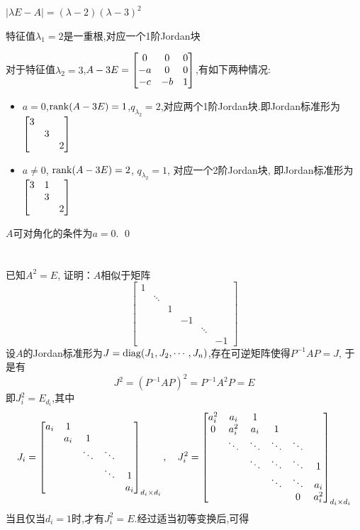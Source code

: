 \documentclass{matrix-homework}
\newcommand{\la}{\lambda}
\begin{document}
\answer
$|\la E-A|=(\la-2)(\la-3)^2$

特征值$\la_1=2$是一重根,对应一个1阶Jordan块

对于特征值$\la_2=3$,$A-3E=\begin{bmatrix}0 & 0 & 0 \\ -a & 0 & 0 \\ -c & -b &1\end{bmatrix}$,有如下两种情况:
\begin{itemize}
    \item $a=0$,$\mathrm{rank}(A-3E)=1$,$q_{\la_2}=2$,对应两个1阶Jordan块.即Jordan标准形为$\begin{bmatrix}3 \\ &3 \\ &&2\end{bmatrix}$
    \item $a\ne 0$, $\mathrm{rank}(A-3E)=2$, $q_{\la_2}=1$, 对应一个2阶Jordan块, 即Jordan标准形为$\begin{bmatrix}3&1 \\ &3 \\ &&2\end{bmatrix}$
\end{itemize}
$A$可对角化的条件为$a=0$.
\qed

\newpage
\section{}

已知$A^2=E$, 证明：$A$相似于矩阵
$$
    \begin{bmatrix}
        1                                \\
         & \ddots                        \\
         &        & 1                    \\
         &        &   & -1               \\
         &        &   &    & \ddots      \\
         &        &   &    &        & -1
    \end{bmatrix}
$$
\answer
设$A$的Jordan标准形为$J=\mathrm{diag}(J_1,J_2,\cdots,J_n)$,存在可逆矩阵使得$P^{-1}AP=J$, 于是有
$$J^2=(P^{-1}AP)^2=P^{-1}A^2P=E$$
即$J_i^2=E_{d_i}$,其中
$$
    J_i=
    \begin{bmatrix}a_i & 1 \\ & a_i & 1 \\ && \ddots & \ddots \\ &&& \ddots & 1 \\ &&&& a_i \end{bmatrix}_{d_i\times d_i}
    ,\quad
    J_i^2=
    \begin{bmatrix}a_i^2 & a_i & 1 \\ 0 & a_i^2 & a_i & 1 \\ & \ddots & \ddots & \ddots & \ddots\\ && \ddots & \ddots & \ddots & 1\\ &&& \ddots & \ddots & a_i \\ &&&& 0 & a_i^2 \end{bmatrix}_{d_i\times d_i}
$$
当且仅当$d_i=1$时,才有$J_i^2=E$.经过适当初等变换后,可得
\end{document}
